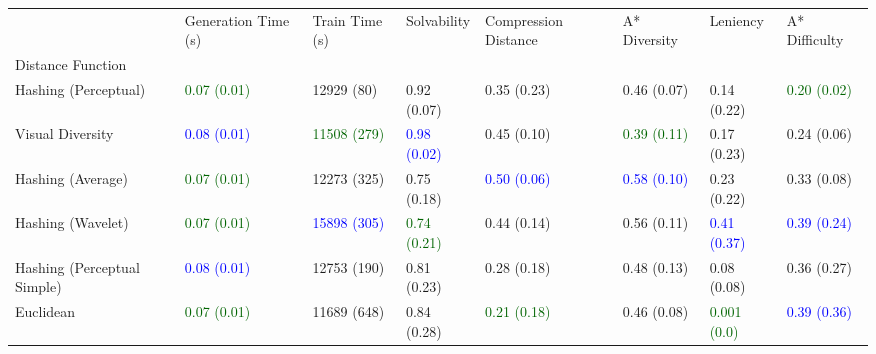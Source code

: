 \begin{tabular}{llllllll}
\toprule
{} &                 Generation Time (s) &                      Train Time (s) &                         Solvability &                Compression Distance &                        A* Diversity &                            Leniency &                       A* Difficulty \\
Distance Function           &                                     &                                     &                                     &                                     &                                     &                                     &                                     \\
\midrule
Hashing (Perceptual)        &  \textcolor{darkgreen}{0.07 (0.01)} &                          12929 (80) &                         0.92 (0.07) &                         0.35 (0.23) &                         0.46 (0.07) &                         0.14 (0.22) &  \textcolor{darkgreen}{0.20 (0.02)} \\
Visual Diversity            &       \textcolor{blue}{0.08 (0.01)} &  \textcolor{darkgreen}{11508 (279)} &       \textcolor{blue}{0.98 (0.02)} &                         0.45 (0.10) &  \textcolor{darkgreen}{0.39 (0.11)} &                         0.17 (0.23) &                         0.24 (0.06) \\
Hashing (Average)           &  \textcolor{darkgreen}{0.07 (0.01)} &                         12273 (325) &                         0.75 (0.18) &       \textcolor{blue}{0.50 (0.06)} &       \textcolor{blue}{0.58 (0.10)} &                         0.23 (0.22) &                         0.33 (0.08) \\
Hashing (Wavelet)           &  \textcolor{darkgreen}{0.07 (0.01)} &       \textcolor{blue}{15898 (305)} &  \textcolor{darkgreen}{0.74 (0.21)} &                         0.44 (0.14) &                         0.56 (0.11) &       \textcolor{blue}{0.41 (0.37)} &       \textcolor{blue}{0.39 (0.24)} \\
Hashing (Perceptual Simple) &       \textcolor{blue}{0.08 (0.01)} &                         12753 (190) &                         0.81 (0.23) &                         0.28 (0.18) &                         0.48 (0.13) &                         0.08 (0.08) &                         0.36 (0.27) \\
Euclidean                   &  \textcolor{darkgreen}{0.07 (0.01)} &                         11689 (648) &                         0.84 (0.28) &  \textcolor{darkgreen}{0.21 (0.18)} &                         0.46 (0.08) &  \textcolor{darkgreen}{0.001 (0.0)} &       \textcolor{blue}{0.39 (0.36)} \\
\bottomrule
\end{tabular}


